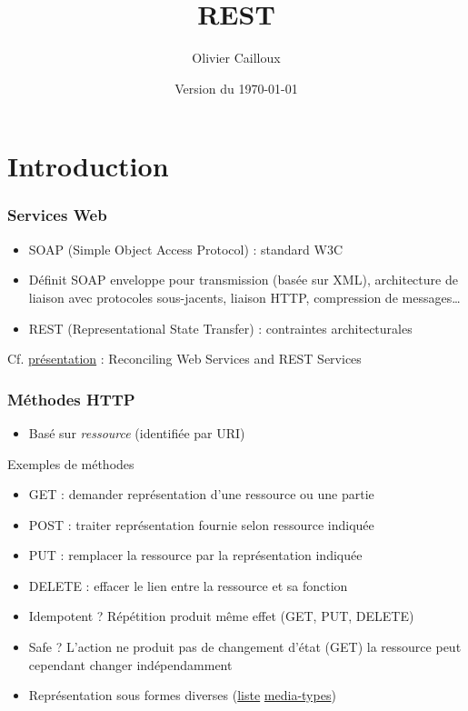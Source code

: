 \documentclass[english, french]{beamer}
\title{REST}
\subtitle{}
\author{Olivier Cailloux}
\institute[LAMSADE]{LAMSADE, Université Paris-Dauphine}
\date{Version du \today}
\begin{document}


\begin{frame}[plain]
   \titlepage
\end{frame}
\addtocounter{framenumber}{-1}

\section{Introduction}
\begin{frame}
	\frametitle{Services Web}
	\begin{itemize}
		\item SOAP (Simple Object Access Protocol) : standard W3C
		\item Définit SOAP enveloppe pour transmission (basée sur XML), architecture de liaison avec protocoles sous-jacents, liaison HTTP, compression de messages…
		\item REST (Representational State Transfer) : contraintes architecturales
	\end{itemize}
	Cf. \href{http://www.w3.org/2005/Talks/1115-hh-k-ecows/}{présentation} : Reconciling Web Services and REST Services
\end{frame}

\begin{frame}
	\frametitle{Méthodes HTTP}
	\begin{itemize}
		\item Basé sur \emph{ressource} (identifiée par URI)
	\end{itemize}
	\begin{block}{Exemples de méthodes}
		\begin{itemize}
			\item GET : demander représentation d’une ressource {\tiny ou une partie}
			\item POST : traiter représentation fournie selon ressource indiquée
			\item PUT : remplacer la ressource par la représentation indiquée
			\item DELETE : effacer le lien entre la ressource et sa fonction
		\end{itemize}
	\end{block}
	\begin{itemize}
		\item Idempotent ? \pause Répétition produit même effet (GET, PUT, DELETE)
		\item Safe ? \pause L’action ne produit pas de changement d’état (GET) {\tiny la ressource peut cependant changer indépendamment}
		\item Représentation sous formes diverses (\href{http://www.iana.org/assignments/media-types/}{liste} \href{http://tools.ietf.org/html/rfc7231\#section-3.1.1.1}{media-types})
	\end{itemize}
\end{frame}
\end{document}
